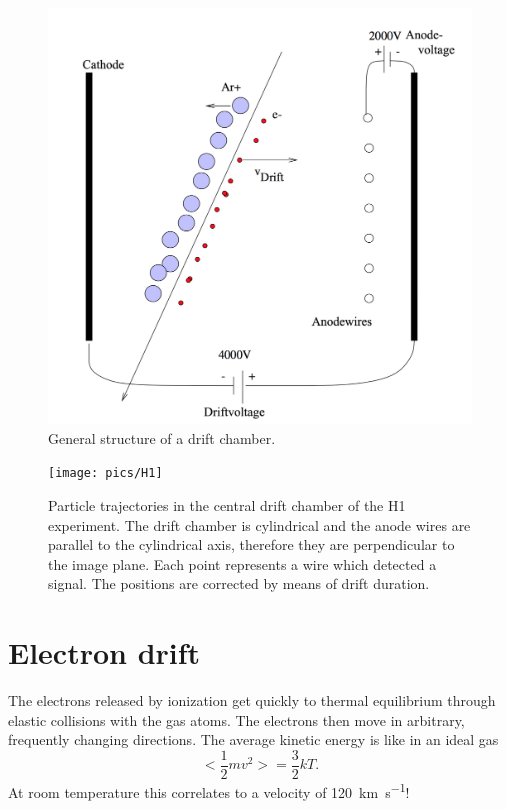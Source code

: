\documentclass[12pt]{article}
\begin{document}
\begin{figure}[h]
\includegraphics[width=13cm]{pics/PRINZIP}
\centering
\caption{General structure of a drift chamber.}
\label{fig:structure}
\end{figure}

\newpage

\begin{figure}[!h]
\texttt{[image: pics/H1]}
\centering
\caption{Particle trajectories in the central drift chamber of the H1 experiment. The drift chamber is cylindrical and the anode wires are parallel to the cylindrical axis, therefore they are perpendicular to the image plane. Each point represents a wire which detected a signal. The positions are corrected by means of drift duration.}
\label{fig:H1_detector}
\end{figure}

\section{Electron drift}

The electrons released by ionization get quickly to thermal equilibrium through elastic collisions with the gas atoms. The electrons then move in arbitrary, frequently changing directions. The average kinetic energy is like in an ideal gas
\begin{equation}
< \frac{1}{2} m v^2 > = \frac{3}{2} k T.
\end{equation}
At room temperature this correlates to a velocity of \SI{120}{\kilo\meter\per\second}!
\end{document}
